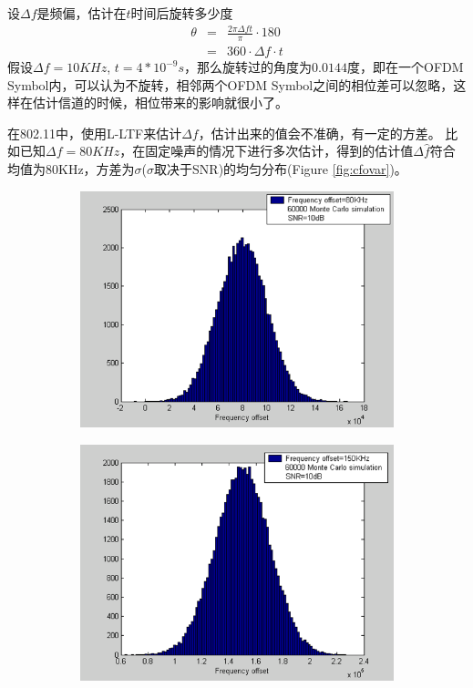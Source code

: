 设$\Delta f$是频偏，估计在$t$时间后旋转多少度
\begin{eqnarray}
\theta & = & \frac{2 \pi \Delta f t}{\pi} \cdot 180 \\
           & = & 360 \cdot \Delta f \cdot t
\end{eqnarray}
假设$\Delta f =  10 KHz$, $t=4 * 10^{-9}s$，那么旋转过的角度为$0.0144$度，即在一个OFDM Symbol内，可以认为不旋转，相邻两个OFDM Symbol之间的相位差可以忽略，这样在估计信道的时候，相位带来的影响就很小了。


在802.11中，使用L-LTF来估计$\Delta f$，估计出来的值会不准确，有一定的方差。
比如已知$\Delta f = 80 KHz$，在固定噪声的情况下进行多次估计，得到的估计值$\Delta \hat{f}$符合均值为80KHz，方差为$\sigma$($\sigma$取决于SNR)的均匀分布(Figure \ref{fig:cfovar})。
\begin{figure}
	\begin{subfigure}[htb]{0.5\textwidth}
		\centering
		\includegraphics[width=\textwidth]{SimCFO1.png}
	\end{subfigure}

	\begin{subfigure}[htb]{0.5\textwidth}
		\centering
		\includegraphics[width=\textwidth]{SimCFO2.png}
	\end{subfigure}


\end{figure}
